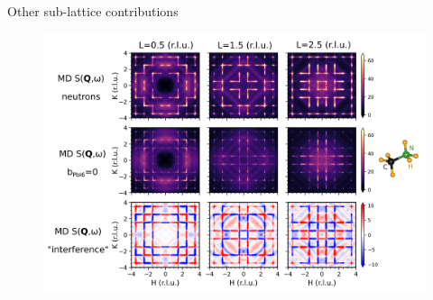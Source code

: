 \documentclass[12pt]{beamer}
\begin{document}
\begin{frame}{Other sub-lattice contributions}

\begin{figure}
    \includegraphics[width=1.0\linewidth]{figs/ma.png}
\end{figure}

\end{frame}

\end{document}
